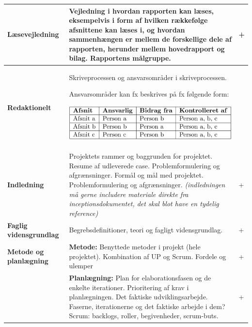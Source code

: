 \begin{longtable}{|p{30mm}|p{90mm}|p{25mm}|}
\textbf{Læsevejledning}     & Vejledning i hvordan rapporten kan læses, eksempelvis i form af hvilken rækkefølge afsnittene kan læses i, og hvordan sammenhængen er mellem de forskellige dele af rapporten, herunder mellem hovedrapport og bilag. Rapportens målgruppe.
                                &   +     \\ \hline

\textbf{Redaktionelt}   & Skriveprocessen og ansvarsområder i skriveprocessen.

Ansvarsområder kan fx beskrives på fx følgende form:

\includegraphics[scale=0.49]{images/kontolskema_bilag_F.png}

                                &           \\ \hline
                                
\textbf{Indledning}     & Projektets rammer og baggrunden for projektet.
Resume af udleverede case.
Problemformulering og afgrænsninger. 
Formål og mål med projektet.
Problemformulering og afgrænsninger. 
\textit{(indledningen må gerne includere materiale direkte fra inceptionsdokumentet, det skal blot have en tydelig reference)}
                                &   +         \\ \hline
                                
\textbf{Faglig vidensgrundlag}  & Begrebsdefinitioner, teori og  fagligt vidensgrundlag.
                                &    +        \\ \hline
                                
\textbf{Metode og planlægning} & \textbf{Metode:} 
Benyttede metoder i projekt (hele projektet).
Kombination af UP og Scrum. Fordele og ulemper
                                &   +         \\ \hline
                                
                            & \textbf{Planlægning:} 
Plan for elaborationsfasen og de enkelte iterationer. Prioritering af krav i planlægningen.
Det faktiske udviklingsarbejde. Faserne, iterationerne og det faktiske  arbejde i dem?
Scrum: backlogs, roller, begivenheder, scrum-buts.
                                &    +        \\ \hline


\end{longtable}
